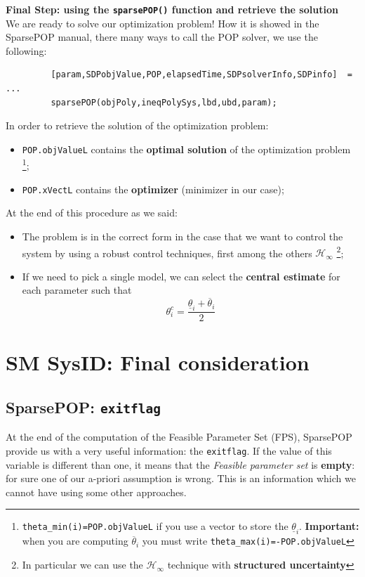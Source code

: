 \noindent
\textbf{Final Step: using the \texttt{sparsePOP()} function and retrieve the solution}\\
We are ready to solve our optimization problem! How it is showed in the SparsePOP manual, there many ways to call the POP solver, we use the following:
{\normalsize{
    \color{blue}
    \begin{verbatim}
         [param,SDPobjValue,POP,elapsedTime,SDPsolverInfo,SDPinfo]  = ... 
         sparsePOP(objPoly,ineqPolySys,lbd,ubd,param); 
    \end{verbatim}
}}
\noindent
In order to retrieve the solution of the optimization problem:
\begin{itemize}
    \itemsep0em
    \item \texttt{POP.objValueL} contains the \textbf{optimal solution} of the optimization problem
    \footnote[5]{\texttt{theta\_min(i)=POP.objValueL} if you use a vector to store the $\underline{\theta}_i$. \textbf{Important: } when you are computing $\overline{\theta}_i$ you must write \texttt{theta\_max(i)=-POP.objValueL}};
    \item \texttt{POP.xVectL} contains the \textbf{optimizer} (minimizer in our case); 
\end{itemize}

\noindent 
At the end of this procedure as we said:
\begin{itemize}
    \item The problem is in the correct form in the case that we want to control the system by using a robust control techniques, first among the others $\mathcal{H}_\infty$
    \footnote[6]{In particular we can use the $\mathcal{H_\infty}$ technique with \textbf{structured uncertainty}}; 
    \item If we need to pick a single model, we can select the \textbf{central estimate} for each parameter such that $$
    \theta_i^c = \frac{\underline{\theta}_i + \overline{\theta}_i}{2}
    $$
\end{itemize}

\section{SM SysID: Final consideration}

\subsection{SparsePOP: \texttt{exitflag}}
At the end of the computation of the Feasible Parameter Set (FPS), SparsePOP provide us with a very useful information: the \texttt{exitflag}. If the value of this variable is different than one, it means that the \textit{Feasible parameter set} is \textbf{empty}: for sure one of our a-priori assumption is wrong. This is an information which we cannot have using some other approaches.

